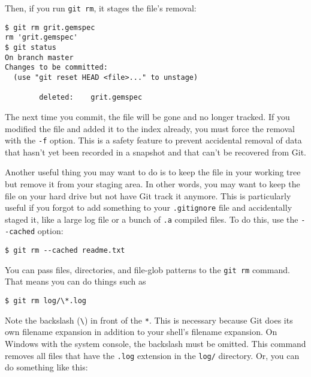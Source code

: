 \documentclass[a4paper]{book}
\begin{document}
Then, if you run \texttt{git rm}, it stages the file's removal:

\begin{shaded}\begin{verbatim}
$ git rm grit.gemspec
rm 'grit.gemspec'
$ git status
On branch master
Changes to be committed:
  (use "git reset HEAD <file>..." to unstage)

        deleted:    grit.gemspec
\end{verbatim}\end{shaded}

The next time you commit, the file will be gone and no longer tracked. If you modified the file and added it to the index already, you must force the removal with the \texttt{-f} option. This is a safety feature to prevent accidental removal of data that hasn't yet been recorded in a snapshot and that can't be recovered from Git.

Another useful thing you may want to do is to keep the file in your working tree but remove it from your staging area. In other words, you may want to keep the file on your hard drive but not have Git track it anymore. This is particularly useful if you forgot to add something to your \texttt{.gitignore} file and accidentally staged it, like a large log file or a bunch of \texttt{.a} compiled files. To do this, use the \texttt{-{}-cached} option:

\begin{shaded}\begin{verbatim}
$ git rm --cached readme.txt
\end{verbatim}\end{shaded}

You can pass files, directories, and file-glob patterns to the \texttt{git rm} command. That means you can do things such as

\begin{shaded}\begin{verbatim}
$ git rm log/\*.log
\end{verbatim}\end{shaded}

Note the backslash (\texttt{\textbackslash{}}) in front of the \texttt{*}. This is necessary because Git does its own filename expansion in addition to your shell's filename expansion. On Windows with the system console, the backslash must be omitted. This command removes all files that have the \texttt{.log} extension in the \texttt{log/} directory. Or, you can do something like this:
\end{document}
